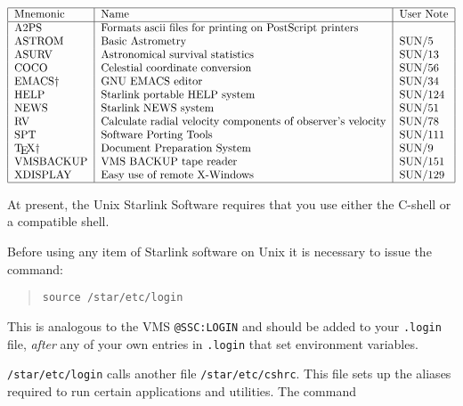 \begin{table}[htb]\caption{Starlink utilities available on
Unix}\label{utilities}
\[\begin{tabular}{|l|l|l|}
\hline
Mnemonic &Name &User Note\\
\hline
A2PS        & Formats ascii files for printing on PostScript printers & \\                      
ASTROM      & Basic Astrometry              & SUN/5  \\
ASURV       & Astronomical survival statistics & SUN/13  \\
COCO        & Celestial coordinate conversion & SUN/56 \\
EMACS\dag   & GNU EMACS editor              & SUN/34  \\
HELP        & Starlink portable HELP system    & SUN/124 \\
NEWS        & Starlink NEWS system             & SUN/51 \\
RV          & Calculate radial velocity components of observer's velocity &
SUN/78 \\
SPT         & Software Porting Tools        & SUN/111 \\
\TeX\dag    & Document Preparation System   & SUN/9   \\
VMSBACKUP   & VMS BACKUP tape reader        & SUN/151 \\
XDISPLAY    & Easy use of remote X-Windows  & SUN/129 \\
\hline
\end{tabular}\]
\end{table}

At present, the Unix Starlink Software requires that you use either
the C-shell or a compatible shell.

Before using any item of Starlink software on Unix it is necessary 
to issue the command:

\begin{quote}

{\tt source /star/etc/login}

\end{quote}

This is analogous to the VMS \verb~@SSC:LOGIN~ 
and should be added to your {\tt .login} file, {\it after} any of your 
own entries in {\tt .login} that set environment variables.

{\tt /star/etc/login} calls another file {\tt /star/etc/cshrc}. This file sets
up the aliases required to run certain applications and utilities. The command


